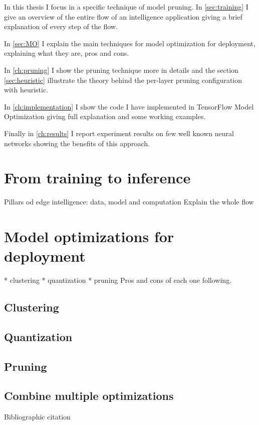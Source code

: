 In this thesis I focus in a specific technique of model pruning.  In
\autoref{sec:training} I give an overview of the entire flow of an
intelligence application giving a brief explanation of every step of the flow.

In \autoref{sec:MO} I explain the main techniques for model optimization for
deployment, explaining what they are, pros and cons.

In \autoref{ch:pruning} I show the pruning technique more in details and
the section \autoref{sec:heuristic} illustrate the theory behind the per-layer
pruning configuration with heuristic.

In \autoref{ch:implementation} I show the code I have implemented in
TensorFlow Model Optimization giving full explanation and some working
examples.

Finally in \autoref{ch:results} I report experiment results on few well known
neural networks showing the benefits of this approach.

\section{From training to inference}\label{sec:training}

Pillars od edge intelligence: data, model and computation
Explain the whole flow
\lipsum[1]

\section{Model optimizations for deployment}\label{sec:MO}
* clustering
* quantization
* pruning
Pros and cons of each one following.
\lipsum[1]

\subsection{Clustering}
\lipsum[1]

\subsection{Quantization}
\lipsum[1]

\subsection{Pruning}
\lipsum[1]

\subsection{Combine multiple optimizations}
\lipsum[1]

Bibliographic citation